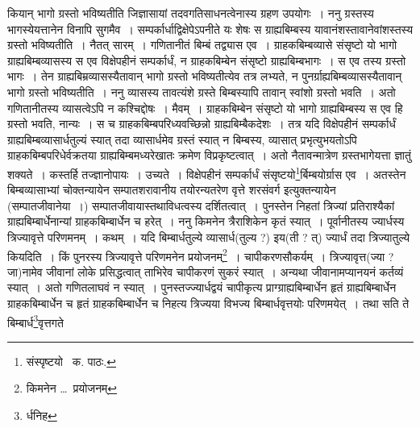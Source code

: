 \documentclass[11pt, openany]{book}
\begin{document}
\noindent कियान् भागो ग्रस्तो भविष्यतीति जिज्ञासायां तदवगतिसाधनत्वेनास्य ग्रहण उपयोगः~। ननु ग्रस्तस्य भागस्येयत्तानेन विनापि सुगमैव~। सम्पर्कार्धाद्विक्षेपेऽपनीते यः शेषः स ग्राह्यबिम्बस्य यावानंशस्तावानेवांशस्तस्य ग्रस्तो भविष्यतीति~। नैतत् सारम्~। गणितानीतं बिम्बं तद्व्यास एव~। ग्राहकबिम्बव्यासे संसृष्टो यो भागो ग्राह्यबिम्बव्यासस्य स एव विक्षेपहीनं सम्पर्कार्धं, न ग्राहकबिम्बेन संसृष्टो ग्राह्यबिम्बभागः~। स एव तस्य ग्रस्तो भागः~। तेन ग्राह्यबिम्रव्यासस्यैतावान् भागो ग्रस्तो भविष्यतीत्येव तत्र लभ्यते, न पुनर्ग्राह्यबिम्बव्यासस्यैतावान् भागो ग्रस्तो
भविष्यतीति~। ननु व्यासस्य तावत्यंशे ग्रस्ते बिम्बस्यापि तावान् स्वांशो ग्रस्तो भवति~। अतो गणितानीतस्य व्यासत्वेऽपि न कश्चिद्दोषः~। मैवम्~। ग्राहकबिम्बेन संसृष्टो यो भागो ग्राह्यबिम्बस्य स एव हि ग्रस्तो भवति, नान्यः~। स च ग्राहकबिम्बपरिध्यवच्छिन्नो ग्राह्यबिम्बैकदेशः~। तत्र यदि विक्षेपहीनं सम्पर्कार्धं ग्राह्यबिम्बव्यासार्धतुल्यं स्यात् तदा व्यासार्धमेव ग्रस्तं स्यात् न बिम्बस्य, व्यासात् प्रभृत्युभयतोऽपि ग्राहकबिम्बपरिधेर्वक्रतया
ग्राह्यबिम्बमध्यरेखातः क्रमेण विप्रकृष्टत्वात्~। अतो नैतावन्मात्रेण ग्रस्तभागेयत्ता ज्ञातुं शक्यते~। कस्तर्हि तज्ज्ञानोपायः~। उच्यते~। विक्षेपहीनं सम्पर्कार्धं संसृष्टयो\renewcommand{\thefootnote}{१}\footnote{संस्पृष्टयो \textendash\ क. पाठः.}र्बिम्बयोर्ग्रास एव~। अतस्तेन बिम्बव्यासाभ्यां चोक्तन्यायेन सम्पातशरावानीय तयोरन्यतरेण {\qt वृत्ते शरसंवर्ग} इत्युक्तन्यायेन (सम्पातजीवानेया~।) सम्पातजीवायास्तथाविधत्वस्य दर्शितत्वात्~। पुनस्तेन निहतां त्रिज्यां प्रतिराश्यैकां ग्राह्यबिम्बार्धेनान्यां ग्राहकबिम्बार्धेन च हरेत्~। ननु किमनेन त्रैराशिकेन कृतं स्यात्~। पूर्वानीतस्य ज्यार्धस्य त्रिज्यावृत्ते परिणमनम्~। कथम्~। यदि बिम्बार्धतुल्ये व्यासार्ध(तुल्य ?) इय(ती ? त्) ज्यार्धं तदा त्रिज्यातुल्ये कियदिति~। किं पुनरस्य त्रिज्यावृत्ते परिणमनेन प्रयोजनम्\renewcommand{\thefootnote}{२}\footnote{किमनेन \ldots\ प्रयोजनम्}~। चापीकरणसौकर्यम्~। त्रिज्यावृत्त(ज्या ? जा)नामेव जीवानां लोके प्रसिद्धत्वात् ताभिरेव चापीकरणं सुकरं स्यात्~। अन्यथा जीवानामप्यानयनं कर्तव्यं स्यात्~। अतो गणितलाघवं न स्यात्~। पुनस्तज्ज्यार्धद्वयं चापीकृत्य प्राग्ग्राह्यबिम्बार्धेन हृतं ग्राह्यबिम्बार्धेन ग्राहकबिम्बार्धेन च हृतं ग्राहकबिम्बार्धेन च निहत्य त्रिज्यया विभज्य बिम्बार्धवृत्तयोः परिणमयेत्~। तथा सति ते बिम्बार्ध\renewcommand{\thefootnote}{३}\footnote{र्धनिह}वृत्तगते

\newpage
\end{document}
